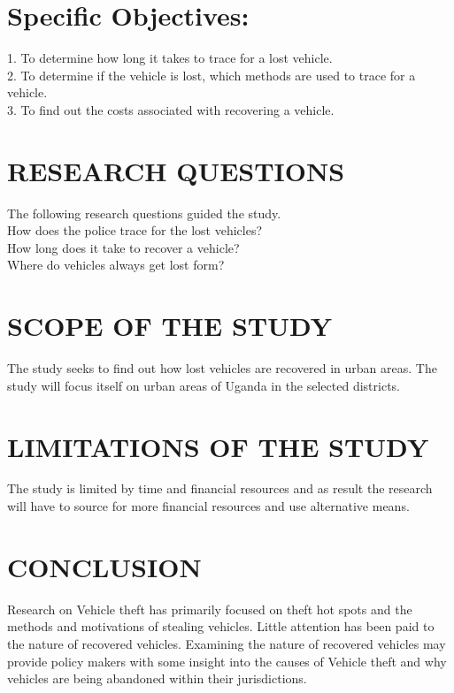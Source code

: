 \documentclass[10pt,letterpaper]{article}
\begin{document}
\section{Specific Objectives: }
1.	To determine how long it takes to trace for a lost vehicle.\\
2.	 To determine if the vehicle is lost, which methods are used to trace for a vehicle.\\ 
3.	 To find out the costs associated with recovering a vehicle.

\section{  RESEARCH QUESTIONS }
 The following research questions guided the study.\\
How does the police trace for the lost vehicles?\\
How long does it take to recover a vehicle?\\
Where do vehicles always get lost form?

\section{SCOPE OF THE STUDY}
 The study seeks to find out how lost vehicles are recovered in urban areas. The study will focus itself on urban areas of Uganda in the selected districts.
\section{ LIMITATIONS OF THE STUDY}
 The study is limited by time and financial resources and as result the research will have to source for more financial resources and use alternative means. 
\section{CONCLUSION}
Research on Vehicle theft has primarily focused on theft hot spots and the methods and motivations of stealing vehicles. Little attention has been paid to the nature of recovered vehicles. Examining the nature of recovered vehicles may provide policy makers with some insight into the causes of Vehicle theft and why vehicles are being abandoned within their jurisdictions.
\end{document}
